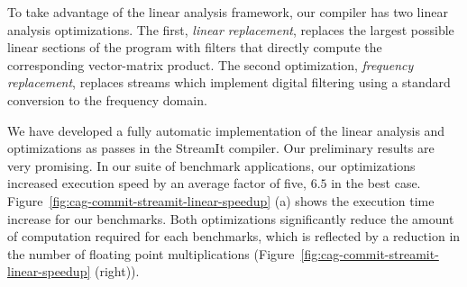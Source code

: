 To take advantage of the linear analysis framework, our compiler
has two linear analysis optimizations. The first, {\it linear replacement},
replaces the largest possible linear sections of the program with filters
that directly compute the corresponding vector-matrix product. 
The second optimization, {\it frequency replacement}, replaces streams 
which implement digital filtering using a standard conversion to the 
frequency domain.

We have developed a fully automatic implementation of the linear analysis 
and optimizations as passes in the StreamIt compiler. Our preliminary results
are very promising. In our suite of benchmark applications, our optimizations
increased execution speed by an average factor of five, $6.5$ in the best 
case. Figure~\ref{fig:cag-commit-streamit-linear-speedup} (a) shows
the execution time increase for our benchmarks. 
Both optimizations significantly reduce the amount of computation required
for each benchmarks, which is reflected by a reduction in the number of floating 
point multiplications (Figure~\ref{fig:cag-commit-streamit-linear-speedup} (right)).

